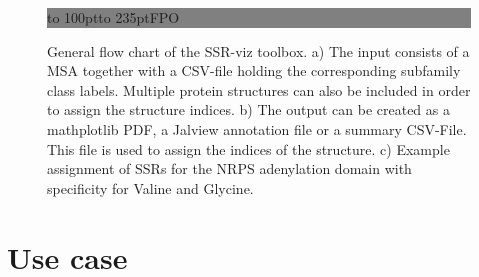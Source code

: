 \documentclass{bioinfo}
\begin{document}
\begin{figure}[!tpb]%
\fboxsep=0pt\colorbox{gray}{\begin{minipage}[t]{235pt} \vbox to 100pt{\vfill\hbox to
235pt{\hfill\fontsize{24pt}{24pt}\selectfont FPO\hfill}\vfill}
\end{minipage}}
\caption{General flow chart of the SSR-viz toolbox. a) The input consists 
of a MSA together with a CSV-file holding the corresponding subfamily class labels. 
Multiple protein structures can also be included in order to assign the 
structure indices. b) The output can be created as a mathplotlib PDF, a Jalview annotation file
or a summary CSV-File. This file is used to assign the indices of the structure.
c) Example assignment of SSRs for the NRPS adenylation domain with specificity for Valine and Glycine.   
}\label{fig:01}
\end{figure}


\section{Use case}
\end{document}
